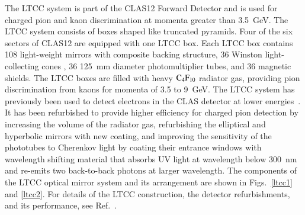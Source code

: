 \documentclass[final,3p,twocolumn]{elsarticle}
\begin{document}
The LTCC system is part of the CLAS12  Forward Detector and is used for charged pion and kaon discrimination at
momenta greater than 3.5~GeV. The LTCC system consists of boxes shaped like truncated pyramids. Four of the six
sectors of CLAS12 are equipped with one LTCC box. Each LTCC box contains 108 light-weight mirrors with composite
backing structure, 36 Winston light-collecting cones , 36 125~mm diameter photomultiplier tubes, and 36 magnetic
shields. The LTCC boxes are filled with heavy $\rm C_4F_{10}$ radiator gas, providing pion discrimination from kaons
for momenta of 3.5 to 9~GeV.  The LTCC system has previously been used to detect electrons in the CLAS detector at
lower energies~\cite{Adams:2001kk}. It has been refurbished to provide higher efficiency for charged pion detection
by increasing the volume of the radiator gas, refurbishing the elliptical and hyperbolic mirrors with new coating, and
improving the sensitivity of the phototubes to Cherenkov light by coating their entrance windows with wavelength
shifting material that absorbs UV light at wavelength below 300~nm and re-emits two back-to-back photons at larger
wavelength. The components of the LTCC optical mirror system and its arrangement are shown in Figs.~\ref{ltcc1}
and \ref{ltcc2}.  For details of the LTCC construction, the detector refurbishments, and its performance, see
Ref.~\cite{LTCC}.   
\end{document}
